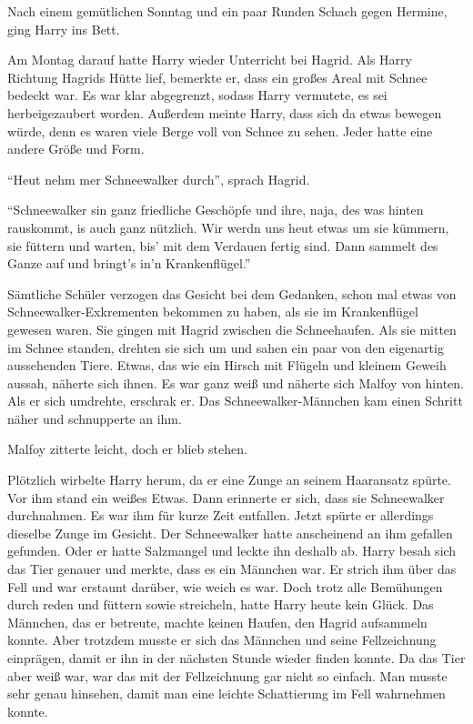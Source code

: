 Nach einem gemütlichen Sonntag und ein paar Runden Schach gegen Hermine, ging Harry ins Bett.

Am Montag darauf hatte Harry wieder Unterricht bei Hagrid. Als Harry Richtung Hagrids Hütte lief, bemerkte er, dass ein großes Areal mit Schnee bedeckt war. Es war klar abgegrenzt, sodass Harry vermutete, es sei herbeigezaubert worden. Außerdem meinte Harry, dass sich da etwas bewegen würde, denn es waren viele Berge voll von Schnee zu sehen. Jeder hatte eine andere Größe und Form.

\enquote{Heut nehm mer Schneewalker durch}, sprach Hagrid.

\enquote{Schneewalker sin ganz friedliche Geschöpfe und ihre, naja, des was hinten rauskommt, is auch ganz nützlich. Wir werdn uns heut etwas um sie kümmern, sie füttern und warten, bis’ mit dem Verdauen fertig sind. Dann sammelt des Ganze auf und bringt’s in’n Krankenflügel.}

Sämtliche Schüler verzogen das Gesicht bei dem Gedanken, schon mal etwas von Schnee\-wal\-ker-Ex\-kre\-men\-ten bekommen zu haben, als sie im Krankenflügel gewesen waren. Sie gingen mit Hagrid zwischen die Schneehaufen. Als sie mitten im Schnee standen, drehten sie sich um und sahen ein paar von den eigenartig aussehenden Tiere. Etwas, das wie ein Hirsch mit Flügeln und kleinem Geweih aussah, näherte sich ihnen. Es war ganz weiß und näherte sich Malfoy von hinten. Als er sich umdrehte, erschrak er. Das Schneewalker-Männchen kam einen Schritt näher und schnupperte an ihm.

Malfoy zitterte leicht, doch er blieb stehen.

Plötzlich wirbelte Harry herum, da er eine Zunge an seinem Haaransatz spürte. Vor ihm stand ein weißes Etwas. Dann erinnerte er sich, dass sie Schneewalker durchnahmen. Es war ihm für kurze Zeit entfallen. Jetzt spürte er allerdings dieselbe Zunge im Gesicht. Der Schneewalker hatte anscheinend an ihm gefallen gefunden. Oder er hatte Salzmangel und leckte ihn deshalb ab. Harry besah sich das Tier genauer und merkte, dass es ein Männchen war. Er strich ihm über das Fell und war erstaunt darüber, wie weich es war. Doch trotz alle Bemühungen durch reden und füttern sowie streicheln, hatte Harry heute kein Glück. Das Männchen, das er betreute, machte keinen Haufen, den Hagrid aufsammeln konnte. Aber trotzdem musste er sich das Männchen und seine Fellzeichnung einprägen, damit er ihn in der nächsten Stunde wieder finden konnte. Da das Tier aber weiß war, war das mit der Fellzeichnung gar nicht so einfach. Man musste sehr genau hinsehen, damit man eine leichte Schattierung im Fell wahrnehmen konnte.

